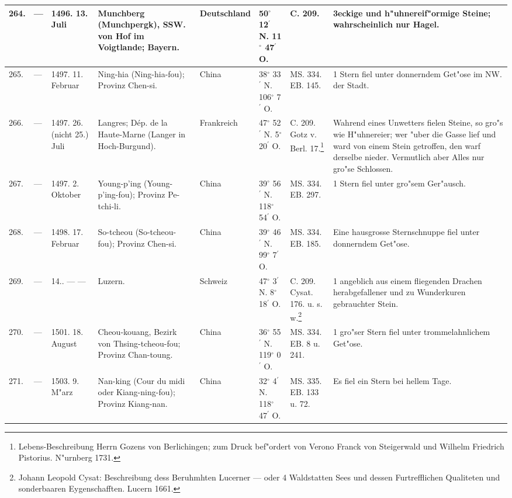\documentclass[a4paper, 8pt, oneside, polutonikogreek, german]{article}
\begin{document}
\begin{center}
\begin{longtable}{| p{5mm} | p{3mm} | p{15mm} | p{25mm} | p{20mm} | p{14mm} | p{17mm} | p{24mm} |}
        264. & --- & 1496. 13. Juli & Munchberg (Munchpergk), SSW. von Hof im Voigtlande; Bayern. & Deutschland & 50$^\circ$ 12$^\prime$ N. 11$^\circ$ 47$^\prime$ O. & C. 209. & 3eckige und h"uhnereif"ormige Steine; wahrscheinlich nur Hagel. \\ \hline
        265. & --- & 1497. 11. Februar & Ning-hia (Ning-hia-fou); Provinz Chen-si. & China & 38$^\circ$ 33$^\prime$ N. 106$^\circ$ 7$^\prime$ O. & MS. 334. EB. 145. & 1 Stern fiel unter donnerndem Get"ose im NW. der Stadt. \\ \hline
        266. & --- & 1497. 26. (nicht 25.) Juli & Langres; Dép. de la Haute-Marne (Langer in Hoch-Burgund). & Frankreich & 47$^\circ$ 52$^\prime$ N. 5$^\circ$ 20$^\prime$ O. & C. 209. Gotz v. Berl. 17.\footnote{Lebens-Beschreibung Herrn Gozens von Berlichingen; zum Druck bef"ordert von Verono Franck von Steigerwald und Wilhelm Friedrich Pistorius. N"urnberg 1731.} & Wahrend eines Unwetters fielen Steine, so gro"s wie H"uhnereier; wer "uber die Gasse lief und ward von einem Stein getroffen, den warf derselbe nieder. Vermutlich aber Alles nur gro"se Schlossen. \\ \hline
        267. & --- & 1497. 2. Oktober & Young-p’ing (Young-p’ing-fou); Provinz Pe-tchi-li. & China & 39$^\circ$ 56$^\prime$ N. 118$^\circ$ 54$^\prime$ O. & MS. 334. EB. 297. & 1 Stern fiel unter gro"sem Ger"ausch. \\ \hline
        268. & --- & 1498. 17. Februar & So-tcheou (So-tcheou-fou); Provinz Chen-si. & China & 39$^\circ$ 46$^\prime$ N. 99$^\circ$ 7$^\prime$ O. & MS. 334. EB. 185. & Eine hausgrosse Sternschnuppe fiel unter donnerndem Get"ose. \\ \hline
        269. & --- & 14.. --- --- & Luzern. & Schweiz & 47$^\circ$ 3$^\prime$ N. 8$^\circ$ 18$^\prime$ O. & C. 209. Cysat. 176. u. s. w.\footnote{Johann Leopold Cysat: Beschreibung dess Beruhmhten Lucerner --- oder 4 Waldstatten Sees und dessen Furtrefflichen Qualiteten und sonderbaaren Eygenschafften. Lucern 1661.
} & 1 angeblich aus einem fliegenden Drachen herabgefallener und zu Wunderkuren gebrauchter Stein. \\ \hline
        270. & --- & 1501. 18. August & Cheou-kouang, Bezirk von Thsing-tcheou-fou; Provinz Chan-toung. & China & 36$^\circ$ 55$^\prime$ N. 119$^\circ$ 0$^\prime$ O. & MS. 334. EB. 8 u. 241. & 1 gro"ser Stern fiel unter trommelahnlichem Get"ose. \\ \hline
        271. & --- & 1503. 9. M"arz & Nan-king (Cour du midi oder Kiang-ning-fou); Provinz Kiang-nan. & China & 32$^\circ$ 4$^\prime$ N. 118$^\circ$ 47$^\prime$ O. & MS. 335. EB. 133 u. 72. & Es fiel ein Stern bei hellem Tage. \\ \hline

\end{longtable}
\end{center}
\end{document}
